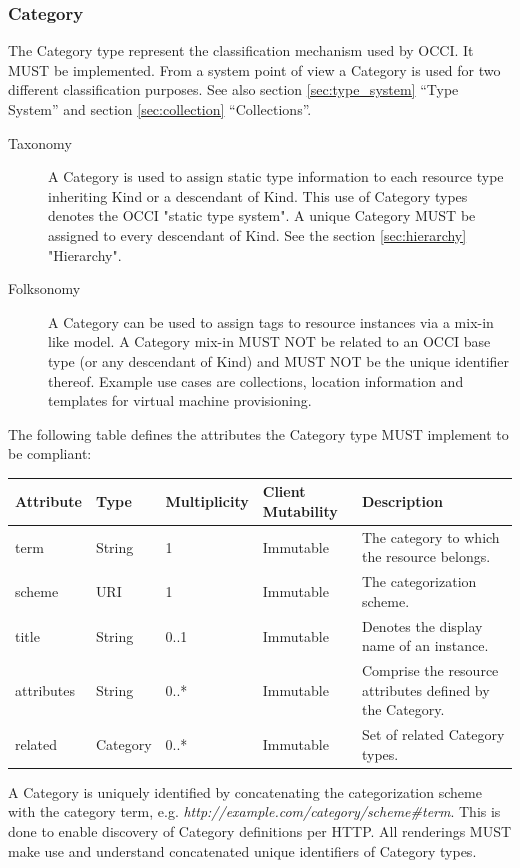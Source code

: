 \documentclass[10pt,a4paper,british]{article}
\begin{document}
\subsubsection{Category}
The Category type represent the classification mechanism used by
OCCI. It MUST be implemented. From a system point of view a Category
is used for two different classification purposes. See also section
\ref{sec:type_system} ``Type System'' and section \ref{sec:collection}
``Collections''.

\begin{description}
\item[Taxonomy] A Category is used to assign static type information
  to each resource type inheriting Kind or a descendant of Kind. This
  use of Category types denotes the OCCI "static type system". A
  unique Category MUST be assigned to every descendant of Kind. See
  the section \ref{sec:hierarchy} "Hierarchy".
\item[Folksonomy] A Category can be used to assign tags to resource
  instances via a mix-in like model. A Category mix-in MUST NOT be
  related to an OCCI base type (or any descendant of Kind) and MUST
  NOT be the unique identifier thereof.  Example use cases are
  collections, location information and templates for virtual machine
  provisioning.
\end{description}

The following table defines the attributes the Category type MUST
implement to be compliant:

\begin{tabular}{l|l|l|l|p{2.7in}}
Attribute & Type & Multiplicity & Client Mutability & Description \\
\hline
term & String & 1 & Immutable & The category to which the resource belongs. \\
scheme & URI & 1 & Immutable & The categorization scheme. \\
title & String & 0..1 & Immutable & Denotes the display name of an instance. \\
attributes & String & 0..* & Immutable & Comprise the resource attributes defined by the Category. \\
related & Category & 0..* & Immutable & Set of related Category types. \\
\end{tabular}

A Category is uniquely identified by concatenating the categorization
scheme with the category term,
e.g. \textit{http://example.com/category/scheme\#term}.  This is done
to enable discovery of Category definitions per HTTP. All renderings
MUST make use and understand concatenated unique identifiers of
Category types.
\end{document}
